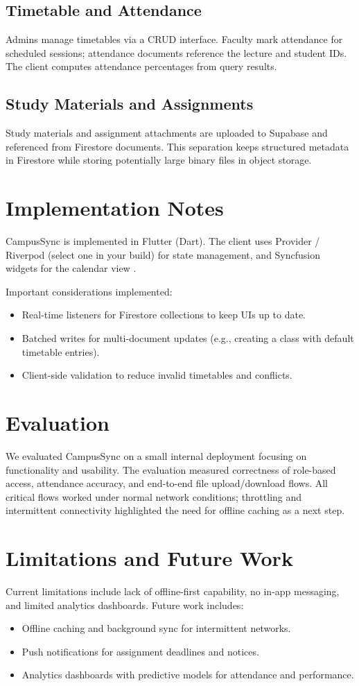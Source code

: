 \documentclass[conference]{IEEEtran}
\begin{document}
\subsection{Timetable and Attendance}
Admins manage timetables via a CRUD interface. Faculty mark attendance for scheduled sessions; attendance documents reference the lecture and student IDs. The client computes attendance percentages from query results.

\subsection{Study Materials and Assignments}
Study materials and assignment attachments are uploaded to Supabase and referenced from Firestore documents. This separation keeps structured metadata in Firestore while storing potentially large binary files in object storage.

\section{Implementation Notes}
CampusSync is implemented in Flutter (Dart). The client uses Provider / Riverpod (select one in your build) for state management, and Syncfusion widgets for the calendar view \cite{syncfusion}.

Important considerations implemented:
\begin{itemize}
    \item Real-time listeners for Firestore collections to keep UIs up to date.
    \item Batched writes for multi-document updates (e.g., creating a class with default timetable entries).
    \item Client-side validation to reduce invalid timetables and conflicts.
\end{itemize}

\section{Evaluation}
We evaluated CampusSync on a small internal deployment focusing on functionality and usability. The evaluation measured correctness of role-based access, attendance accuracy, and end-to-end file upload/download flows. All critical flows worked under normal network conditions; throttling and intermittent connectivity highlighted the need for offline caching as a next step.

\section{Limitations and Future Work}
Current limitations include lack of offline-first capability, no in-app messaging, and limited analytics dashboards. Future work includes:
\begin{itemize}
    \item Offline caching and background sync for intermittent networks.
    \item Push notifications for assignment deadlines and notices.
    \item Analytics dashboards with predictive models for attendance and performance.
\end{itemize}
\end{document}
